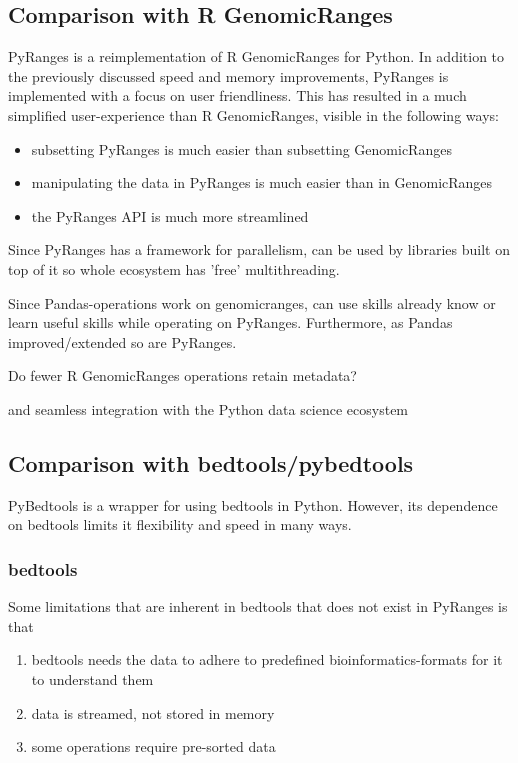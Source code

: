 \documentclass[10pt,letterpaper]{article}
\begin{document}
\subsection*{Comparison with R GenomicRanges}

PyRanges is a reimplementation of R GenomicRanges for Python. In addition to the
previously discussed speed and memory improvements, PyRanges is implemented with
a focus on user friendliness. This has resulted in a much simplified
user-experience than R GenomicRanges, visible in the following ways:

\begin{itemize}
  \item subsetting PyRanges is much easier than subsetting GenomicRanges
  \item manipulating the data in PyRanges is much easier than in GenomicRanges
  \item the PyRanges API is much more streamlined
\end{itemize}

Since PyRanges has a framework for parallelism, can be used by libraries built
on top of it so whole ecosystem has 'free' multithreading.

Since Pandas-operations work on genomicranges, can use skills already know or
learn useful skills while operating on PyRanges. Furthermore, as Pandas
improved/extended so are PyRanges.

Do fewer R GenomicRanges operations retain metadata?

and seamless integration with the Python data
science ecosystem

\subsection*{Comparison with bedtools/pybedtools}

PyBedtools is a wrapper for using bedtools in Python. However, its dependence on
bedtools limits it flexibility and speed in many ways.

\subsubsection*{bedtools}

Some limitations that are inherent in bedtools that does not exist in PyRanges
is that

\begin{enumerate}
  \item bedtools needs the data to adhere to predefined bioinformatics-formats
    for it to understand them
  \item data is streamed, not stored in memory
  \item some operations require pre-sorted data
\end{enumerate}
\end{document}

